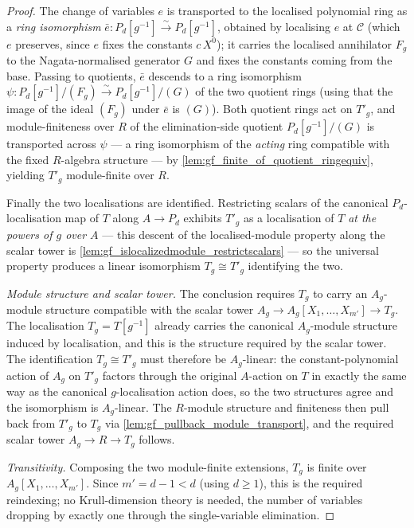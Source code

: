 \begin{proof}
  The change of variables \(e\) is transported to the localised polynomial ring as a
  \emph{ring isomorphism} \(\bar e : P_d[g^{-1}] \xrightarrow{\sim} P_d[g^{-1}]\), obtained
  by localising \(e\) at \(\mathcal{C}\) (which \(e\) preserves, since \(e\) fixes the
  constants \(c\,X^0\)); it carries the localised annihilator \(F_g\) to the
  Nagata-normalised generator \(G\) and fixes the constants coming from the base. Passing
  to quotients, \(\bar e\) descends to a ring isomorphism
  \(\psi : P_d[g^{-1}]/(F_g) \xrightarrow{\sim} P_d[g^{-1}]/(G)\) of the two quotient rings
  (using that the image of the ideal \((F_g)\) under \(\bar e\) is \((G)\)). Both quotient
  rings act on \(T'_g\), and module-finiteness over \(R\) of the elimination-side quotient
  \(P_d[g^{-1}]/(G)\) is transported across \(\psi\) — a ring isomorphism of the
  \emph{acting} ring compatible with the fixed \(R\)-algebra structure — by
  \cref{lem:gf_finite_of_quotient_ringequiv}, yielding \(T'_g\) module-finite over \(R\).

  Finally the two localisations are identified. Restricting scalars of the canonical
  \(P_d\)-localisation map of \(T\) along \(A \to P_d\) exhibits \(T'_g\) as a localisation
  of \(T\) \emph{at the powers of \(g\) over \(A\)} — this descent of the
  localised-module property along the scalar tower is
  \cref{lem:gf_islocalizedmodule_restrictscalars} — so the universal property produces a
  linear isomorphism \(T_g \cong T'_g\) identifying the two.

  \emph{Module structure and scalar tower.} The conclusion requires \(T_g\) to carry an
  \(A_g\)-module structure compatible with the scalar tower
  \(A_g \to A_g[X_1, \dots, X_{m'}] \to T_g\). The localisation \(T_g = T[g^{-1}]\) already
  carries the canonical \(A_g\)-module structure induced by localisation, and this is the
  structure required by the scalar tower. The identification \(T_g \cong T'_g\) must
  therefore be \(A_g\)-linear: the constant-polynomial action of \(A_g\) on \(T'_g\) factors
  through the original \(A\)-action on \(T\) in exactly the same way as the canonical
  \(g\)-localisation action does, so the two structures agree and the isomorphism is
  \(A_g\)-linear. The \(R\)-module structure and finiteness then pull back from \(T'_g\) to
  \(T_g\) via \cref{lem:gf_pullback_module_transport}, and the required scalar tower
  \(A_g \to R \to T_g\) follows.

  \emph{Transitivity.} Composing the two module-finite extensions, \(T_g\) is finite over
  \(A_g[X_1, \dots, X_{m'}]\). Since \(m' = d - 1 < d\) (using \(d \ge 1\)), this is the
  required reindexing; no Krull-dimension theory is needed, the number of variables
  dropping by exactly one through the single-variable elimination.
\end{proof}

